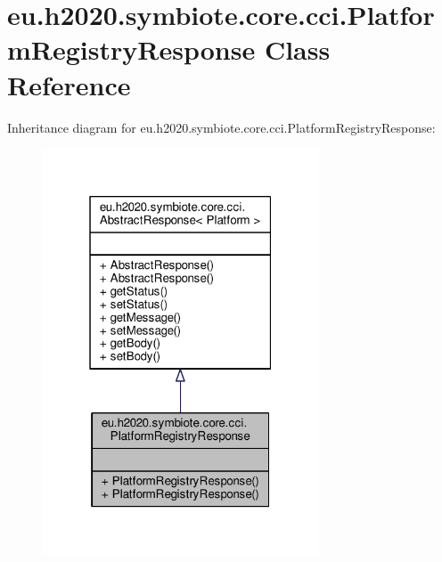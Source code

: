 \hypertarget{classeu_1_1h2020_1_1symbiote_1_1core_1_1cci_1_1PlatformRegistryResponse}{}\section{eu.\+h2020.\+symbiote.\+core.\+cci.\+Platform\+Registry\+Response Class Reference}
\label{classeu_1_1h2020_1_1symbiote_1_1core_1_1cci_1_1PlatformRegistryResponse}


Inheritance diagram for eu.\+h2020.\+symbiote.\+core.\+cci.\+Platform\+Registry\+Response\+:\nopagebreak
\begin{figure}[H]
\begin{center}
\leavevmode
\includegraphics[width=232pt]{classeu_1_1h2020_1_1symbiote_1_1core_1_1cci_1_1PlatformRegistryResponse__inherit__graph}
\end{center}
\end{figure}


